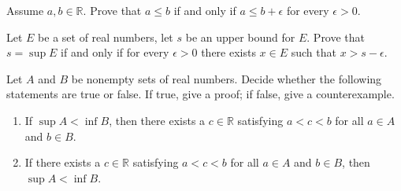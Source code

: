 \documentclass[12pt,letterpaper,boxed]{hmcpset}
\begin{document}
\begin{problem}[Exercise 4.8.]
Assume $a, b \in \mathbb{R}.$ Prove that $a \leq b$ if and only if $a \leq b + \epsilon$ for every $\epsilon > 0.$
\end{problem}

\begin{solution}
\end{solution}

\begin{problem}[Exercise 4.9.]
Let $E$ be a set of real numbers, let $s$ be an upper bound for $E$. Prove that $s = \sup E$ if and only if for every $\epsilon > 0$ there exists $x \in E$ such that $x > s - \epsilon.$
\end{problem}

\begin{solution}
\end{solution}

\begin{problem}[Exercise 4.10.]
Let $A$ and $B$ be nonempty sets of real numbers. Decide whether the following statements are true or false. If true, give a proof; if false, give a counterexample.
\begin{enumerate}
	\itemsep0em
	\item If $\sup A < \inf B$, then there exists a $c \in \mathbb{R}$ satisfying $a < c < b$ for all $a \in A$ and $b \in B$.
	\item If there exists a $c\in \mathbb{R}$ satisfying $a < c < b$ for all $a \in A$ and $b \in B$, then $\sup A < \inf B$.
\end{enumerate}
\end{problem}

\begin{solution}
\end{solution}
\end{document}
